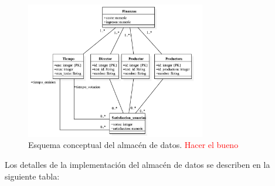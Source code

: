 \documentclass[12pt]{opticajnl}
\begin{document}
\begin{figure}[h]
\centering
\includegraphics[width=0.7\textwidth]{fotos/3.png}
\caption{Esquema conceptual del almacén de datos. \textcolor{red}{Hacer el bueno}}
\label{fig:esquema_almacen}
\end{figure}

Los detalles de la implementación del almacén de datos se describen en la siguiente tabla: 
\end{document}

